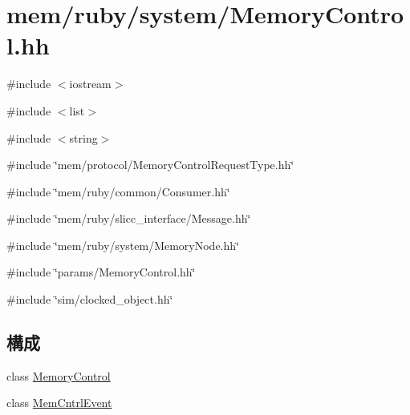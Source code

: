 \hypertarget{MemoryControl_8hh}{
\section{mem/ruby/system/MemoryControl.hh}
\label{MemoryControl_8hh}
}
{\ttfamily \#include $<$iostream$>$}\par
{\ttfamily \#include $<$list$>$}\par
{\ttfamily \#include $<$string$>$}\par
{\ttfamily \#include \char`\"{}mem/protocol/MemoryControlRequestType.hh\char`\"{}}\par
{\ttfamily \#include \char`\"{}mem/ruby/common/Consumer.hh\char`\"{}}\par
{\ttfamily \#include \char`\"{}mem/ruby/slicc\_\-interface/Message.hh\char`\"{}}\par
{\ttfamily \#include \char`\"{}mem/ruby/system/MemoryNode.hh\char`\"{}}\par
{\ttfamily \#include \char`\"{}params/MemoryControl.hh\char`\"{}}\par
{\ttfamily \#include \char`\"{}sim/clocked\_\-object.hh\char`\"{}}\par
\subsection*{構成}
\begin{DoxyCompactItemize}
\item 
class \hyperlink{classMemoryControl}{MemoryControl}
\item 
class \hyperlink{classMemoryControl_1_1MemCntrlEvent}{MemCntrlEvent}
\end{DoxyCompactItemize}
